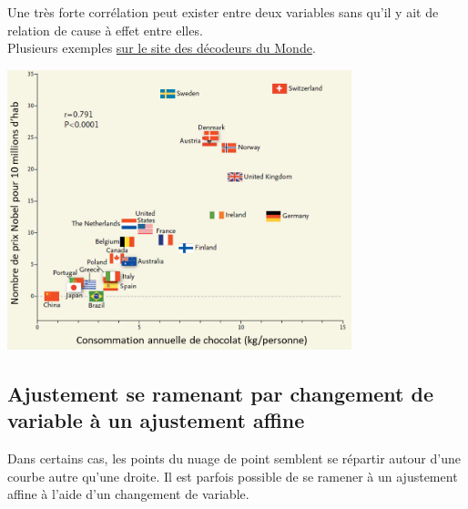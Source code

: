 \documentclass[a4paper,11pt,cours]{nsi} %
\begin{document}

\begin{remarque}
    Une très forte corrélation peut exister entre deux variables sans qu'il y ait de relation de cause à effet entre elles.\\
    Plusieurs exemples \href{https://www.lemonde.fr/les-decodeurs/article/2019/01/02/correlation-ou-causalite-brillez-en-societe-avec-notre-generateur-aleatoire-de-comparaisons-absurdes_5404286_4355770.html}{sur le site des décodeurs du Monde}.
    \begin{center}
        \includegraphics[width=10cm]{Chocalat_prix_Nobel.png}
    \end{center}
\end{remarque}




\subsection*{Ajustement se ramenant par changement de variable à un ajustement affine}
Dans certains cas, les points du nuage de point semblent se répartir autour d'une courbe autre qu'une droite. Il est parfois possible de se ramener à un ajustement affine à l'aide d'un changement de variable.
\end{document}
